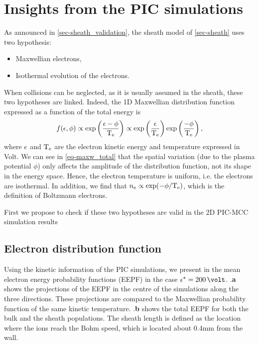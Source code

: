 


\section{Insights from the PIC simulations}
  \label{sec-insights}

  As announced in \cref{sec-sheath_validation}, the sheath model of \cref{sec-sheath} uses two hypothesis\string:
  \begin{itemize}
    \item Maxwellian electrons,
    \item Isothermal evolution of the electrons.
  \end{itemize}

  When collisions can be neglected, as it is usually assumed in the sheath, these two hypotheses are linked.
  Indeed, the \ac{1D} Maxwellian distribution function expressed as a function of the total energy is
  \begin{equation} \label{eq-maxw_total}
    f(\epsilon, \phi) \propto \exp \left( \frac{\epsilon - \phi}{\mathrm{T_e}}  \right)  \propto \exp \left( \frac{\epsilon}{\mathrm{T_e}} \right) \exp \left( \frac{-\phi}{\mathrm{T_e}} \right),
  \end{equation}
  where $\epsilon$ and $\mathrm{T_e}$ are the electron kinetic energy and temperature expressed in Volt.
  We can see in \cref{eq-maxw_total} that the spatial variation (due to the plasma potential $\phi$) only affects the amplitude of the distribution function, not its shape in the energy space.
  Hence, the electron temperature is uniform, i.e. the electrons are isothermal.
  In addition, we find that $n_e \propto \exp (- \phi / \mathrm{T_e})$, which is the definition of Boltzmann electrons.

  First we propose to check  if these two hypotheses are valid  in the \ac{2D} \ac{PIC}-\ac{MCC} simulation results

  \subsection{Electron distribution function}
    \label{subsec-eedf_2D}

    Using the kinetic information of the PIC simulations, we present in  the mean electron energy probability functions (EEPF) in the case $\crover = 200\,\volt$.
    .{\bf a} shows the projections of the EEPF in the centre of the simulations along the three directions.
    These projections are compared to the Maxwellian probability function of the same
    kinetic temperature.
    .{\bf b} shows the total EEPF for both the bulk and the sheath populations.
    The sheath length is defined as the location where the ions reach the Bohm speed, which is located about 0.4mm from the wall.
     
